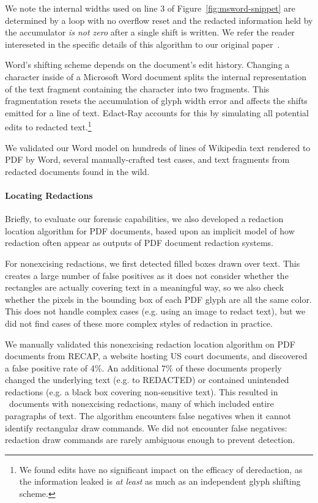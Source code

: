We note the internal widths used on line 3 of Figure~\ref{fig:msword-snippet} are determined by a loop with no overflow reset and the redacted information held by the accumulator \emph{is not zero} after a single shift is written.
We refer the reader intereseted in the specific details of this algorithm to our original paper~\cite{bland2023story}.

Word's shifting scheme depends on the document's edit history. 
Changing a character inside of a Microsoft Word document splits the internal representation of the text fragment containing the character into two fragments. 
This fragmentation resets the accumulation of glyph width error and affects the shifts emitted for a line of text. 
Edact-Ray accounts for this by simulating all potential edits to redacted text.\footnote{
    We found edits have no significant impact on the efficacy of deredaction, as the information leaked is \emph{at least} as much as an independent glyph shifting scheme.
    }

We validated our Word model on hundreds of lines of Wikipedia text rendered to PDF by Word, several manually-crafted test cases, and text fragments from redacted documents found in the wild.



\paragraph{Locating Redactions}
Briefly, to evaluate our forensic capabilities, we also developed a redaction location algorithm for PDF documents, based upon an implicit model of how redaction often appear as outputs of PDF document redaction systems.

For nonexcising redactions, we first detected filled boxes drawn over text.
This creates a large number of false positives as it does not consider whether the rectangles are actually covering text in a meaningful way, so we also check whether the pixels in the bounding box of each PDF glyph are all the same color.
This does not handle complex cases (e.g. using an image to redact text), but we did not find cases of these more complex styles of redaction in practice.

We manually validated this nonexcising redaction location algorithm on PDF documents from RECAP, a website hosting US court documents, and discovered a false positive rate of 4\%.
An additional 7\% of these documents properly changed the underlying text (e.g. to REDACTED) or contained unintended redactions (e.g. a black box covering non-sensitive text).
This resulted in \numRECAPredactionDocs\ documents with nonexcising redactions, many of which included entire paragraphs of text.
The algorithm encounters false negatives when it cannot identify rectangular draw commands.
We did not encounter false negatives: redaction draw commands are rarely ambiguous enough to prevent detection.


